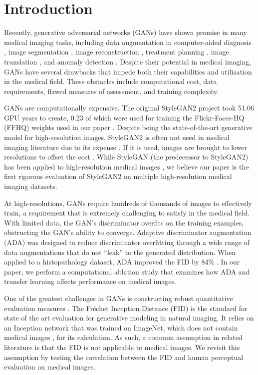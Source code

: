 \documentclass[runningheads]{llncs}
\begin{document}
\section{Introduction}

Recently, generative adversarial networks (GANs) have shown promise in many medical imaging tasks, including data augmentation in computer-aided diagnosis \cite{Pang2021}, image segmentation \cite{Xun2022}, image reconstruction \cite{Luo2021}, treatment planning \cite{Aleef2021}, image translation \cite{Jiang2021}, and anomaly detection \cite{Schlegl2017}.
Despite their potential in medical imaging, GANs have several drawbacks that impede both their capabilities and utilization in the medical field.
These obstacles include computational cost, data requirements, flawed measures of assessment, and training complexity.

GANs are computationally expensive.
The original StyleGAN2 project took 51.06 GPU years to create, 0.23 of which were used for training the Flickr-Faces-HQ (FFHQ) weights used in our paper \cite{Karras2020_2}.
Despite being the state-of-the-art generative model for high-resolution images, StyleGAN2 is often not used in medical imaging literature due to its expense \cite{Segal2021}.
If it is used, images are brought to lower resolutions to offset the cost \cite{Montero2021,Pocev2021}.
While StyleGAN \cite{Karras2019} (the predecessor to StyleGAN2) has been applied to high-resolution medical images \cite{Fetty2020}, we believe our paper is the first rigorous evaluation of StyleGAN2 on multiple high-resolution medical imaging datasets.

At high-resolutions, GANs require hundreds of thousands of images to effectively train, a requirement that is extremely challenging to satisfy in the medical field.
With limited data, the GAN's discriminator overfits on the training examples, obstructing the GAN's ability to converge.
Adaptive discriminator augmentation (ADA) was designed to reduce discriminator overfitting through a wide range of data augmentations that do not ``leak'' to the generated distribution.
When applied to a histopathology dataset, ADA improved the FID by 84\% \cite{Karras2020_ada}.
In our paper, we perform a computational ablation study that examines how ADA and transfer learning affects performance on medical images.

One of the greatest challenges in GANs is constructing robust quantitative evaluation measures \cite{Lucic2018}.
The Fr\'{e}chet Inception Distance (FID) \cite{Heusel2017} is the standard for state of the art evaluation for generative modeling in natural imaging.
It relies on an Inception network that was trained on ImageNet, which does not contain medical images \cite{deng2009}, for its calculation.
As such, a common assumption in related literature is that the FID is not applicable to medical images.
We revisit this assumption by testing the correlation between the FID and human perceptual evaluation on medical images.
\end{document}

